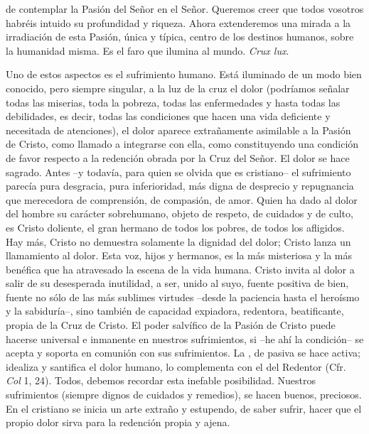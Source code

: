 \begin{body}
 de contemplar la Pasión del Señor en el Señor. Queremos creer que todos vosotros habréis intuido su profundidad y riqueza. Ahora extenderemos una mirada a la irradiación de esta Pasión, única y típica, centro de los destinos humanos, sobre la humanidad misma. Es el faro que ilumina al mundo. \textit{Crux lux}.

Uno de estos aspectos es el sufrimiento humano. Está iluminado de un modo bien conocido, pero siempre singular, a la luz de la cruz el dolor (podríamos señalar todas las miserias, toda la pobreza, todas las enfermedades y hasta todas las debilidades, es decir, todas las condiciones que hacen una vida deficiente y necesitada de atenciones), el dolor aparece extrañamente asimilable a la Pasión de Cristo, como llamado a integrarse con ella, como constituyendo una condición de favor respecto a la redención obrada por la Cruz del Señor. El dolor se hace sagrado. Antes –y todavía, para quien se olvida que es cristiano– el sufrimiento parecía pura desgracia, pura inferioridad, más digna de desprecio y repugnancia que merecedora de comprensión, de compasión, de amor. Quien ha dado al dolor del hombre su carácter sobrehumano, objeto de respeto, de cuidados y de culto, es Cristo doliente, el gran hermano de todos los pobres, de todos los afligidos. Hay más, Cristo no demuestra solamente la dignidad del dolor; Cristo lanza un llamamiento al dolor. Esta voz, hijos y hermanos, es la más misteriosa y la más benéfica que ha atravesado la escena de la vida humana. Cristo invita al dolor a salir de su desesperada inutilidad, a ser, unido al suyo, fuente positiva de bien, fuente no sólo de las más sublimes virtudes –desde la paciencia hasta el heroísmo y la sabiduría–, sino también de capacidad expiadora, redentora, beatificante, propia de la Cruz de Cristo. El poder salvífico de la Pasión de Cristo puede hacerse universal e inmanente en nuestros sufrimientos, si –he ahí la condición– se acepta y soporta en comunión con sus sufrimientos. La , de pasiva se hace activa; idealiza y santifica el dolor humano, lo complementa con el del Redentor (Cfr. \textit{Col} 1, 24). Todos, debemos recordar esta inefable posibilidad. Nuestros sufrimientos (siempre dignos de cuidados y remedios), se hacen buenos, preciosos. En el cristiano se inicia un arte extraño y estupendo, de saber sufrir, hacer que el propio dolor sirva para la redención propia y ajena.


\end{body}
